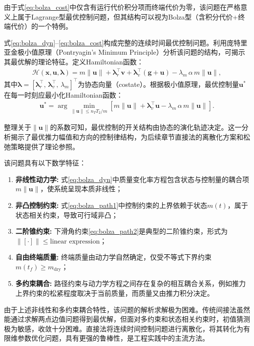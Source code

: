 由于式\eqref{eq:bolza_cost}中仅含有运行代价积分项而终端代价为零，该问题在严格意义上属于Lagrange型最优控制问题，但其结构可以视为Bolza型（含积分代价+终端代价）的一个特例。

式\eqref{eq:bolza_dyn}--\eqref{eq:bolza_cost}构成完整的连续时间最优控制问题。利用庞特里亚金极小值原理（Pontryagin's Minimum Principle）分析该问题的结构，可揭示其最优解的理论特征。定义Hamiltonian函数：
\begin{align}
    \mathcal{H}(\bm{x}, \bm{u}, \bm{\lambda}) = m\|\bm{u}\| + \bm{\lambda}_r^{\top}\bm{v} + \bm{\lambda}_v^{\top}(\bm{g} + \bm{u}) - \lambda_m\,\alpha\,m\|\bm{u}\|,
\end{align}
其中$\bm{\lambda} = [\bm{\lambda}_r^{\top},\, \bm{\lambda}_v^{\top},\, \lambda_m]^{\top}$为协态向量（costate）。根据极小值原理，最优控制量$\bm{u}^*$在每一时刻应最小化Hamiltonian函数：
\begin{align}
    \bm{u}^* = \arg\min_{\|\bm{u}\| \leq n_T T_2/m} \left[ m\|\bm{u}\| + \bm{\lambda}_v^{\top}\bm{u} - \lambda_m\,\alpha\,m\|\bm{u}\| \right].
\end{align}

整理关于$\|\bm{u}\|$的系数可知，最优控制的开关结构由协态的演化轨迹决定。这一分析揭示了最优推力幅值和方向的控制律结构，为后续章节直接法的离散化方案和松弛策略提供了理论参照。

该问题具有以下数学特征：
\begin{enumerate}
    \item \textbf{非线性动力学:} 式\eqref{eq:bolza_dyn}中质量变化率方程包含状态与控制量的耦合项$m\|\bm{u}\|$，使系统呈现本质非线性；
    \item \textbf{非凸控制约束:} 式\eqref{eq:bolza_path1}中控制约束的上界依赖于状态$m(t)$，属于状态相关约束，导致可行域非凸；
    \item \textbf{二阶锥约束:} 下滑角约束\eqref{eq:bolza_path2}是典型的二阶锥约束，形式为$\|[\cdot]\| \leq \text{linear expression}$；
    \item \textbf{自由终端质量:} 终端质量由动力学自然确定，仅受不等式下界约束$m(t_f) \geq m_{\mathrm{dry}}$；
    \item \textbf{多约束耦合:} 路径约束与动力学方程之间存在复杂的相互耦合关系，例如推力上界约束的松紧程度取决于当前质量，而质量又由推力积分决定。
\end{enumerate}

由于上述非线性和多约束耦合特性，该问题的解析求解极为困难。传统间接法虽然能通过求解两点边值问题得到最优解，但面对多约束和状态相关约束时，初值猜测极为敏感，收敛十分困难。直接法将连续时间控制问题进行离散化，将其转化为有限维参数优化问题，具有更强的鲁棒性，是工程实践中的主流方法。

